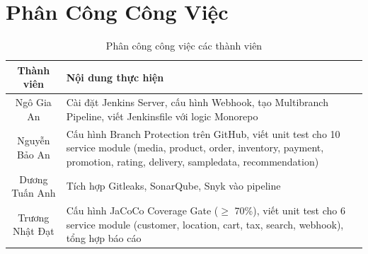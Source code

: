 \section{Phân Công Công Việc}

\begin{table}[H]
\centering
\caption{Phân công công việc các thành viên}
\begin{tabular}{|c|p{12cm}|}
\hline
\textbf{Thành viên} & \textbf{Nội dung thực hiện} \\
\hline
Ngô Gia An & Cài đặt Jenkins Server, cấu hình Webhook, tạo Multibranch Pipeline, viết Jenkinsfile với logic Monorepo \\
\hline
Nguyễn Bảo An & Cấu hình Branch Protection trên GitHub, viết unit test cho 10 service module (media, product, order, inventory, payment, promotion, rating, delivery, sampledata, recommendation) \\
\hline
Dương Tuấn Anh & Tích hợp Gitleaks, SonarQube, Snyk vào pipeline \\
\hline
Trương Nhật Đạt & Cấu hình JaCoCo Coverage Gate ($\geq$ 70\%), viết unit test cho 6 service module (customer, location, cart, tax, search, webhook), tổng hợp báo cáo \\
\hline
\end{tabular}
\end{table}
